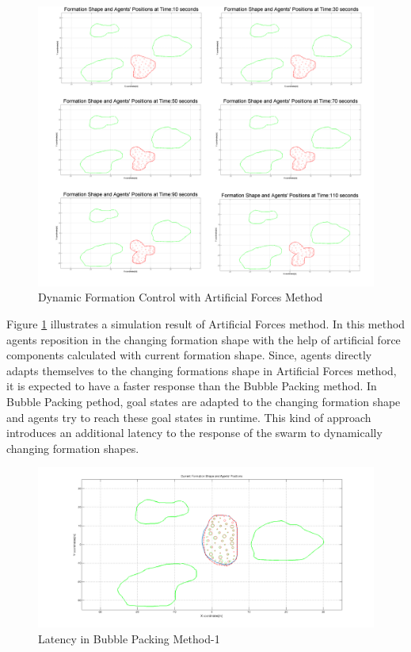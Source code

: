 \begin{figure}[H]
\caption{Dynamic Formation Control with Artificial Forces Method} \label{multiple2_ref}
\centerline{\includegraphics[scale = 0.16]{multiple2}}
\end{figure} 		 

Figure \ref{multiple2_ref} illustrates a simulation result of Artificial Forces method. In this method agents reposition in the changing formation shape with the help of artificial force components calculated with current formation shape. Since, agents directly adapts themselves to the changing formations shape in Artificial Forces method, it is expected to have a faster response than the Bubble Packing method. In Bubble Packing pethod, goal states are adapted to the changing formation shape and agents try to reach these goal states in runtime. This kind of approach introduces an additional latency to the response of the swarm to dynamically changing formation shapes. 

\begin{figure}[H]
\caption{Latency in Bubble Packing Method-1} \label{combo1_ref}
\centerline{\includegraphics[scale = 0.35]{combo1}}
\end{figure} 

